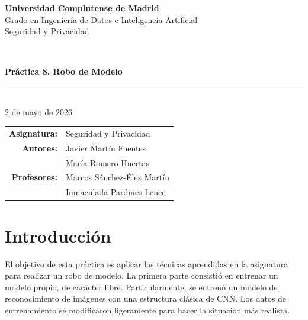 \documentclass[11pt,a4paper]{article}
\begin{document}
\thispagestyle{empty}

\begin{center}
  \vspace*{2cm}
  {\large\bfseries Universidad Complutense de Madrid}\\[0.4em]
  Grado en Ingeniería de Datos e Inteligencia Artificial\\
  Seguridad y Privacidad\\[3cm]

  \noindent\textcolor{ucmteal}{\rule{\linewidth}{1.5pt}}\\[0.5em]
  {\LARGE\bfseries Práctica 8. Robo de Modelo}\\[0.3em]
  \noindent\textcolor{ucmteal}{\rule{\linewidth}{1.5pt}}\\[3cm]

  2 de mayo de 2026\\[1.5cm]

  \begin{tabular}{rl}
    \textbf{Asignatura:} & Seguridad y Privacidad \\[0.4em]
    \textbf{Autores:}    & Javier Martín Fuentes \\
                         & María Romero Huertas \\[0.4em]
    \textbf{Profesores:} & Marcos Sánchez-Élez Martín \\
                         & Inmaculada Pardines Lence \\
  \end{tabular}
\end{center}

\newpage

\tableofcontents
\newpage

\section{Introducción}

El objetivo de esta práctica es aplicar las técnicas aprendidas en la asignatura para realizar un robo de modelo. La primera parte consistió en entrenar un modelo propio, de carácter libre. Particularmente, se entrenó un modelo de reconocimiento de imágenes con una estructura clásica de CNN. Los datos de entrenamiento se modificaron ligeramente para hacer la situación más realista.
\end{document}
